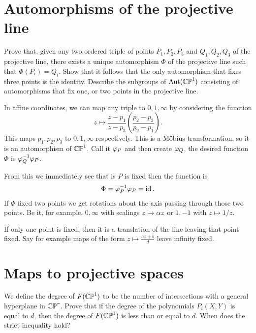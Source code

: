 \documentclass[12pt]{memoir}
\begin{document}
\section{Automorphisms of the projective line}

\begin{Ej}
    Prove that, given any two ordered triple of points $P_1,P_2,P_3$
 and $Q_1,Q_2,Q_3$
of the projective line, there exists a unique automorphism $\Phi$
 of the projective line such that $\Phi(P_i)=Q_i$.
Show that it follows that the only automorphism that fixes three points is the identity.
Describe the subgroups of $\operatorname{Aut}(\mathbb{CP}^1)$
 consisting of automorphisms that fix one, or two points in the projective line.
\end{Ej}

\begin{ptcbr}
    In affine coordinates, we can map any triple to $0,1,\infty$ by considering the function 
    $$z\mapsto\frac{z-p_1}{z-p_3}\left(\frac{p_2-p_3}{p_2-p_1}\right).$$
    This maps $p_1,p_2,p_3$ to $0,1,\infty$ respectively. This is a Möbius transformation, so it is an automorphism of $\mathbb{CP}^1$. Call it $\varphi_P$ and then create $\varphi_Q$, the desired function $\Phi$ is $\varphi_Q^{-1}\varphi_P$.\par
    From this we immediately see that is $P$ is fixed then the function is 
    $$\Phi=\varphi_P^{-1}\varphi_P=\operatorname{id}.$$
    If $\Phi$ fixed two points we get rotations about the axis passing through those two points. Be it, for example, $0,\infty$ with scalings $z\mapsto \alpha z$ or $1,-1$ with $z\mapsto 1/z$.\par
    If only one point is fixed, then it is a translation of the line leaving that point fixed. Say for example maps of the form $z\mapsto \frac{az+b}{d}$ leave infinity fixed.
\end{ptcbr}
\section{Maps to projective spaces}

\begin{Ej}
    We define the degree of $F(\mathbb{CP}^1)$ to be the number of intersections with a general hyperplane in $\mathbb{CP}^r$.  Prove that if the degree of the polynomials $P_i(X,Y)$ is equal to $d$, then the degree of $F(\mathbb{CP}^1)$ is less than or equal to $d$. When does the strict inequality hold?
\end{Ej}

\begin{ptcbr}
    
\end{ptcbr}
\newpage
\end{document}
